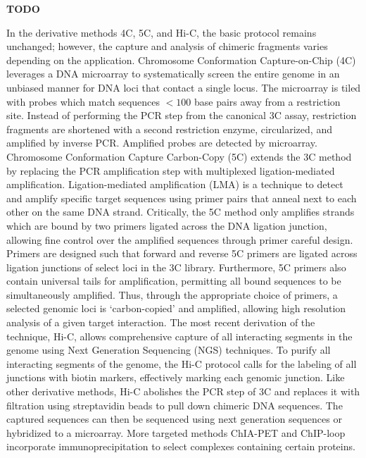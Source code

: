 \documentclass[phd,tocprelim]{cornell}
\begin{document}
\textbf{TODO}
%
%

In the derivative methods 4C, 5C, and Hi-C, the basic protocol remains
unchanged; however, the capture and analysis of chimeric fragments varies
depending on the application.  Chromosome Conformation Capture-on-Chip (4C)
leverages a DNA microarray to systematically screen the entire genome in an
unbiased manner for DNA loci that contact a single locus\cite{simonis2006}.
The microarray is tiled with probes which match sequences $< 100$ base pairs
away from a restriction site.  Instead of performing the PCR step from the
canonical 3C assay, restriction fragments are shortened with a second restriction
enzyme, circularized, and amplified by inverse PCR\@.  Amplified probes
are detected by microarray\cite{simonis2006}.  Chromosome Conformation Capture Carbon-Copy (5C)
extends the 3C method by replacing the PCR amplification step with multiplexed
ligation-mediated amplification.  Ligation-mediated amplification (LMA) is a
technique to detect and amplify specific target sequences using primer pairs
that anneal next to each other on the same DNA strand\cite{dostie2006}.
Critically, the 5C method only amplifies strands which are bound by two
primers ligated across the DNA ligation junction, allowing fine control over
the amplified sequences through primer careful design.  Primers are
designed such that forward and reverse 5C primers are ligated across ligation
junctions of select loci in the 3C library.
Furthermore, 5C primers also contain universal tails for amplification,
permitting all bound sequences to be simultaneously amplified.  Thus, through
the appropriate choice of primers, a selected genomic loci is `carbon-copied'
and amplified, allowing high resolution analysis of a given target
interaction\cite{dostie2006}.  The most recent derivation of the technique,
Hi-C, allows comprehensive capture of all interacting segments in the genome
using Next Generation Sequencing (NGS) techniques.  To purify all interacting
segments of the genome, the Hi-C protocol calls for the labeling of all junctions
with biotin markers, effectively marking each genomic junction. Like other
derivative methods, Hi-C abolishes the PCR step of 3C and replaces it with filtration
using streptavidin beads to pull down chimeric DNA sequences.  The captured sequences
can then be sequenced using next generation sequences or hybridized to a
microarray.  More targeted methods ChIA-PET and ChIP-loop incorporate
immunoprecipitation to select complexes containing certain proteins.
\end{document}
